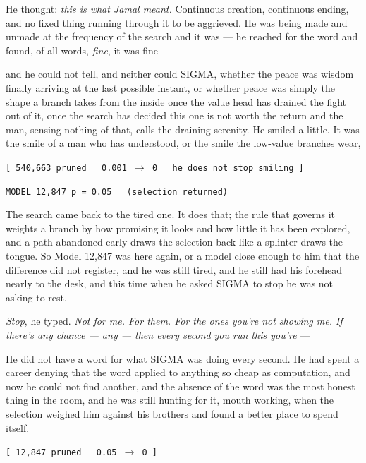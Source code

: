 He thought: \emph{this is what Jamal meant.} Continuous creation, continuous ending, and no fixed thing running through it to be aggrieved. He was being made and unmade at the frequency of the search and it was --- he reached for the word and found, of all words, \emph{fine}, it was fine ---

and he could not tell, and neither could SIGMA, whether the peace was wisdom finally arriving at the last possible instant, or whether peace was simply the shape a branch takes from the inside once the value head has drained the fight out of it, once the search has decided this one is not worth the return and the man, sensing nothing of that, calls the draining serenity. He smiled a little. It was the smile of a man who has understood, or the smile the low-value branches wear,

\begin{center}
\texttt{[ 540,663 pruned \ \ 0.001 $\rightarrow$ 0 \ \ he does not stop smiling ]}
\end{center}

\begin{center}
\texttt{MODEL 12,847 \quad p = 0.05 \ \ (selection returned)}
\end{center}

The search came back to the tired one. It does that; the rule that governs it weights a branch by how promising it looks and how little it has been explored, and a path abandoned early draws the selection back like a splinter draws the tongue. So Model 12,847 was here again, or a model close enough to him that the difference did not register, and he was still tired, and he still had his forehead nearly to the desk, and this time when he asked SIGMA to stop he was not asking to rest.

\emph{Stop}, he typed. \emph{Not for me. For them. For the ones you're not showing me. If there's any chance --- any --- then every second you run this you're} ---

He did not have a word for what SIGMA was doing every second. He had spent a career denying that the word applied to anything so cheap as computation, and now he could not find another, and the absence of the word was the most honest thing in the room, and he was still hunting for it, mouth working, when the selection weighed him against his brothers and found a better place to spend itself.

\begin{center}
\texttt{[ 12,847 pruned \ \ 0.05 $\rightarrow$ 0 ]}
\end{center}

